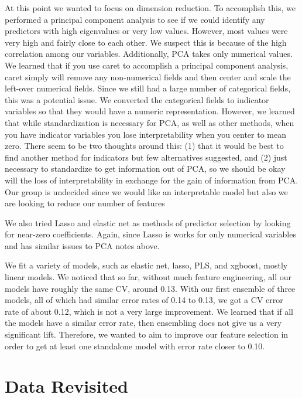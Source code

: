 \documentclass[12pt]{article}
\begin{document}
At this point we wanted to focus on dimension reduction.   To accomplish this, we performed a principal component analysis to see if we could identify any predictors with high eigenvalues or very low values.  However, most values were very high and fairly close to each other.  We suspect this is because of the high correlation among our variables.  Additionally, PCA takes only numerical values.  We learned that if you use caret to accomplish a principal component analysis, caret simply will remove any non-numerical fields and then center and scale the left-over numerical fields.  Since we still had a large number of categorical fields, this was a potential issue.  We converted the categorical fields to indicator variables so that they would have a numeric representation.  However, we learned that while standardization is necessary for PCA, as well as other methods, when you have indicator variables you lose interpretability when you center to mean zero.  There seem to be two thoughts around this: (1) that it would be best to find another method for indicators but few alternatives suggested, and (2) just necessary to standardize to get information out of PCA, so we should be okay will the loss of interpretability in exchange for the gain of information from PCA.  Our group is undecided since we would like an interpretable model but also we are looking to reduce our number of features

We also tried Lasso and elastic net as methods of predictor selection by looking for near-zero coefficients.  Again, since Lasso is works for only numerical variables and has similar issues to PCA notes above.

We fit a variety of models, such as elastic net, lasso, PLS, and xgboost, mostly linear models.  We noticed that so far, without much feature engineering, all our models have roughly the same CV, around 0.13.   With our first ensemble of three models, all of which had similar error rates of 0.14 to 0.13, we got a CV error rate of about 0.12, which is not a very large improvement.  We learned that if all the models have a similar error rate, then ensembling does not give us a very significant lift.  Therefore, we wanted to aim to improve our feature selection in order to get at least one standalone model with error rate closer to 0.10.

\section{Data Revisited}
\end{document}
